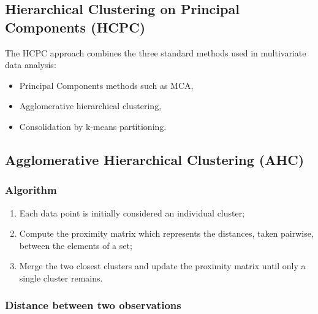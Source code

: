 \documentclass[
]{book}
\providecommand{\tightlist}{%
  \setlength{\itemsep}{0pt}\setlength{\parskip}{0pt}}
\begin{document}
\hypertarget{hierarchical-clustering-on-principal-components-hcpc}{%
\subsection{Hierarchical Clustering on Principal Components (HCPC)}\label{hierarchical-clustering-on-principal-components-hcpc}}

The HCPC approach combines the three standard methods used in multivariate data analysis:

\begin{itemize}
\tightlist
\item
  Principal Components methods such as MCA,
\item
  Agglomerative hierarchical clustering,
\item
  Consolidation by k-means partitioning.
\end{itemize}

\hypertarget{agglomerative-hierarchical-clustering-ahc}{%
\subsection{Agglomerative Hierarchical Clustering (AHC)}\label{agglomerative-hierarchical-clustering-ahc}}

\hypertarget{algorithm-1}{%
\subsubsection*{Algorithm}\label{algorithm-1}}

\begin{enumerate}
\def\labelenumi{\arabic{enumi}.}
\tightlist
\item
  Each data point is initially considered an individual cluster;
\item
  Compute the proximity matrix which represents the distances, taken pairwise, between the elements of a set;
\item
  Merge the two closest clusters and update the proximity matrix until only a single cluster remains.
\end{enumerate}

\hypertarget{distance-between-two-observations}{%
\subsubsection*{Distance between two observations}\label{distance-between-two-observations}}
\end{document}
